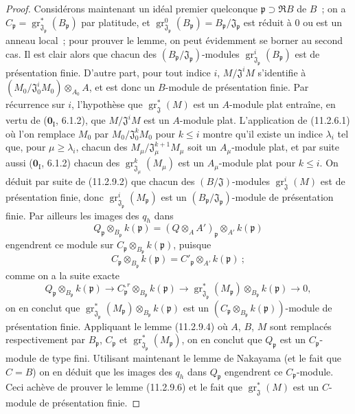 \begin{proof}
Considérons maintenant un idéal premier quelconque
$\mathfrak p\supset\mathfrak RB$ de $B$~; on a
$C_\mathfrak p=\operatorname{gr}_{\mathfrak J_\mathfrak p}^*(B_\mathfrak p)$
par platitude, et
$\operatorname{gr}_{\mathfrak J_\mathfrak p}^0(B_\mathfrak p)
=B_\mathfrak p/\mathfrak J_\mathfrak p$ est réduit à 0 ou est un anneau
local~; pour prouver le lemme, on peut évidemment se borner au second cas. Il
est clair alors que chacun des $(B_\mathfrak p/\mathfrak J_\mathfrak p)$-modules
$\operatorname{gr}_{\mathfrak J_\mathfrak p}^i(B_\mathfrak p)$ est de
présentation finie. D'autre part, pour tout indice $i$,
$M/\mathfrak J^iM$ s'identifie à
$(M_0/\mathfrak J_0^iM_0)\otimes_{A_0}A$, et est donc un $B$-module de
présentation finie. Par récurrence sur $i$, l'hypothèse que
$\operatorname{gr}_{\mathfrak J}^*(M)$ est un $A$-module plat entraîne, en
vertu de ($\mathbf 0_{\mathrm I}$, 6.1.2), que $M/\mathfrak J^iM$ est un
$A$-module plat. L'application de (11.2.6.1) où l'on remplace $M_0$ par
$M_0/\mathfrak J_0^kM_0$ pour $k\leq i$ montre qu'il existe un indice
$\lambda_i$ tel que, pour $\mu\geq\lambda_i$, chacun des
$M_\mu/\mathfrak J_\mu^{k+1}M_\mu$ soit un $A_\mu$-module plat, et par suite
aussi ($\mathbf 0_{\mathrm I}$, 6.1.2) chacun des
$\operatorname{gr}_{\mathfrak J_\mu}^k(M_\mu)$ est un $A_\mu$-module plat
pour $k\leq i$. On déduit par suite de (11.2.9.2) que chacun des
$(B/\mathfrak J)$-modules $\operatorname{gr}_{\mathfrak J}^i(M)$ est de
présentation finie, donc
$\operatorname{gr}_{\mathfrak J_\mathfrak p}^i(M_\mathfrak p)$ est un
$(B_\mathfrak p/\mathfrak J_\mathfrak p)$-module de présentation finie. Par
ailleurs les images des $q_h$ dans
\[
Q_\mathfrak p\otimes_{B_\mathfrak p}k(\mathfrak p)
=(Q\otimes_AA')_\mathfrak p\otimes_{A'}k(\mathfrak p)
\]
engendrent ce module sur
$C_\mathfrak p\otimes_{B_\mathfrak p}k(\mathfrak p)$, puisque
\[
C_\mathfrak p\otimes_{B_\mathfrak p}k(\mathfrak p)
=C'_\mathfrak p\otimes_{A'}k(\mathfrak p)~;
\]
comme on a la suite exacte
\[
Q_\mathfrak p\otimes_{B_\mathfrak p}k(\mathfrak p)
\longrightarrow C_\mathfrak p^{,r}\otimes_{B_\mathfrak p}k(\mathfrak p)
\longrightarrow
\operatorname{gr}_{\mathfrak J_\mathfrak p}^*(M_\mathfrak p)
\otimes_{B_\mathfrak p}k(\mathfrak p)\longrightarrow0,
\]
on en conclut que
$\operatorname{gr}_{\mathfrak J_\mathfrak p}^*(M_\mathfrak p)
\otimes_{B_\mathfrak p}k(\mathfrak p)$ est un
$(C_\mathfrak p\otimes_{B_\mathfrak p}k(\mathfrak p))$-module de présentation
finie. Appliquant le lemme (11.2.9.4) où $A$, $B$, $M$ sont remplacés
respectivement par $B_\mathfrak p$, $C_\mathfrak p$ et
$\operatorname{gr}_{\mathfrak J_\mathfrak p}^*(M_\mathfrak p)$, on en conclut
que $Q_\mathfrak p$ est un $C_\mathfrak p$-module de type fini. Utilisant
maintenant le lemme de Nakayama (et le fait que $C=B$) on en déduit que les
images des $q_h$ dans $Q_\mathfrak p$ engendrent ce $C_\mathfrak p$-module.
Ceci achève de prouver le lemme (11.2.9.6) et le fait que
$\operatorname{gr}_{\mathfrak J}^*(M)$ est un $C$-module de présentation
finie.


\end{proof}
